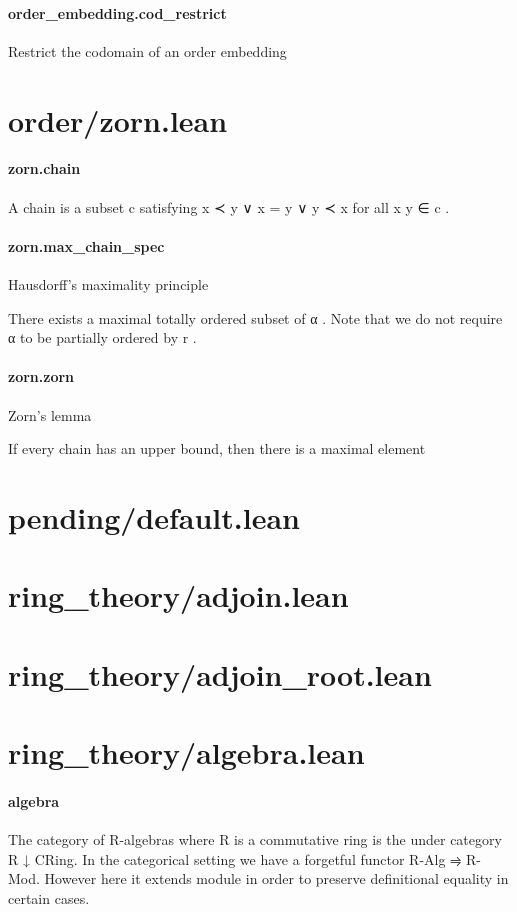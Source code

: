 \documentclass{article}
\begin{document}
\paragraph{order\_embedding.cod\_restrict}
\par
Restrict the codomain of an order embedding
\section{order/zorn.lean}\paragraph{zorn.chain}
\par
A chain is a subset 
\colorbox[RGB]{253,246,227}{{{{\color[RGB]{101, 123, 131} c }}}} satisfying
\colorbox[RGB]{253,246,227}{{{{\color[RGB]{101, 123, 131} x ≺ y  }}}{{{\color[RGB]{181, 137, 0} ∨ }}}{{{\color[RGB]{101, 123, 131}  x  }}}{{{\color[RGB]{181, 137, 0} = }}}{{{\color[RGB]{101, 123, 131}  y  }}}{{{\color[RGB]{181, 137, 0} ∨ }}}{{{\color[RGB]{101, 123, 131}  y ≺ x }}}} for all 
\colorbox[RGB]{253,246,227}{{{{\color[RGB]{101, 123, 131} x y ∈ c }}}}.
\paragraph{zorn.max\_chain\_spec}
\par
Hausdorff's maximality principle
\par
There exists a maximal totally ordered subset of 
\colorbox[RGB]{253,246,227}{{{{\color[RGB]{101, 123, 131} α }}}}.
Note that we do not require 
\colorbox[RGB]{253,246,227}{{{{\color[RGB]{101, 123, 131} α }}}} to be partially ordered by 
\colorbox[RGB]{253,246,227}{{{{\color[RGB]{101, 123, 131} r }}}}.
\paragraph{zorn.zorn}
\par
Zorn's lemma
\par
If every chain has an upper bound, then there is a maximal element
\section{pending/default.lean}\section{ring\_theory/adjoin.lean}\section{ring\_theory/adjoin\_root.lean}\section{ring\_theory/algebra.lean}\paragraph{algebra}
\par
The category of R-algebras where R is a commutative
ring is the under category R ↓ CRing. In the categorical
setting we have a forgetful functor R-Alg ⥤ R-Mod.
However here it extends module in order to preserve
definitional equality in certain cases.
\end{document}

